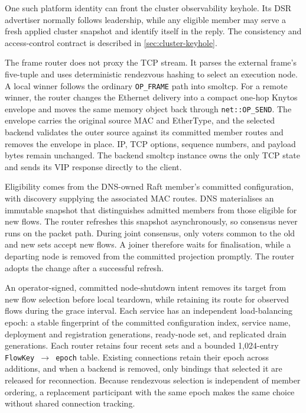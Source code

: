 One such platform identity can front the cluster observability keyhole. Its DSR
advertiser normally follows leadership, while any eligible member may serve a
fresh applied cluster snapshot and identify itself in the reply.
The consistency and access-control contract is described in
\autoref{sec:cluster-keyhole}.

The frame router does not proxy the TCP stream. It parses the external frame's
five-tuple and uses deterministic rendezvous hashing to select an execution
node. A local winner follows the ordinary
\texttt{OP\_FRAME} path into smoltcp. For a remote winner, the router changes
the Ethernet delivery into a compact one-hop Knytos envelope and moves the
same memory object back through \texttt{net::OP\_SEND}. The envelope carries
the original source MAC and EtherType, and the selected backend validates the
outer source against its committed member routes and removes the envelope in
place. IP, TCP options, sequence numbers, and payload bytes remain unchanged.
The
backend smoltcp instance owns the only TCP state and sends its VIP response
directly to the client.

Eligibility comes from the DNS-owned Raft member's committed configuration,
with discovery supplying the associated MAC routes. DNS materialises an
immutable snapshot that distinguishes admitted members from those eligible for
new flows. The router refreshes this snapshot asynchronously, so consensus never
runs on the packet path. During joint consensus, only voters common to the old
and new sets accept new flows. A joiner therefore waits for finalisation, while
a departing node is removed from the committed projection promptly. The router
adopts the change after a successful refresh.

An operator-signed, committed node-shutdown intent removes its target from new
flow selection before local teardown, while retaining its route for observed
flows during the grace interval. Each service has an independent
load-balancing epoch: a stable fingerprint of the committed configuration
index, service name, deployment and registration generations, ready-node set,
and replicated drain generations. Each router retains four recent sets and a
bounded 1,024-entry \texttt{FlowKey $\rightarrow$ epoch} table. Existing
connections retain their epoch across additions, and when a backend is removed,
only bindings that selected it are released for reconnection. Because rendezvous
selection is independent of member ordering, a replacement participant with
the same epoch makes the same choice without shared connection tracking.

